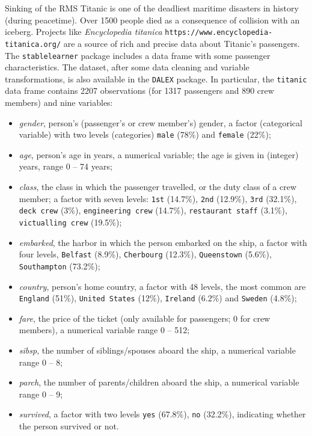 \documentclass[12pt,]{krantz}
\providecommand{\tightlist}{%
  \setlength{\itemsep}{0pt}\setlength{\parskip}{0pt}}
\begin{document}
Sinking of the RMS Titanic is one of the deadliest maritime disasters in history (during peacetime). Over 1500 people died as a consequence of collision with an iceberg. Projects like \emph{Encyclopedia titanica} \texttt{https://www.encyclopedia-titanica.org/} are a source of rich and precise data about Titanic's passengers.
The \texttt{stablelearner} package includes a data frame with some passenger characteristics.
The dataset, after some data cleaning and variable transformations, is also available in the \texttt{DALEX} package. In particular, the \texttt{titanic} data frame contains 2207 observations (for 1317 passengers and 890 crew members) and nine variables:

\begin{itemize}
\tightlist
\item
  \emph{gender}, person's (passenger's or crew member's) gender, a factor (categorical variable) with two levels (categories) \texttt{male} (78\%) and \texttt{female} (22\%);
\item
  \emph{age}, person's age in years, a numerical variable; the age is given in (integer) years, range 0 -- 74 years;
\item
  \emph{class}, the class in which the passenger travelled, or the duty class of a crew member; a factor with seven levels: \texttt{1st} (14.7\%), \texttt{2nd} (12.9\%), \texttt{3rd} (32.1\%), \texttt{deck\ crew} (3\%), \texttt{engineering\ crew} (14.7\%), \texttt{restaurant\ staff} (3.1\%), \texttt{victualling\ crew} (19.5\%);
\item
  \emph{embarked}, the harbor in which the person embarked on the ship, a factor with four levels, \texttt{Belfast} (8.9\%), \texttt{Cherbourg} (12.3\%), \texttt{Queenstown} (5.6\%), \texttt{Southampton} (73.2\%);
\item
  \emph{country}, person's home country, a factor with 48 levels, the most common are \texttt{England} (51\%), \texttt{United\ States} (12\%), \texttt{Ireland} (6.2\%) and \texttt{Sweden} (4.8\%);
\item
  \emph{fare}, the price of the ticket (only available for passengers; 0 for crew members), a numerical variable range 0 -- 512;
\item
  \emph{sibsp}, the number of siblings/spouses aboard the ship, a numerical variable range 0 -- 8;
\item
  \emph{parch}, the number of parents/children aboard the ship, a numerical variable range 0 -- 9;
\item
  \emph{survived}, a factor with two levels \texttt{yes} (67.8\%), \texttt{no} (32.2\%), indicating whether the person survived or not.
\end{itemize}
\end{document}
